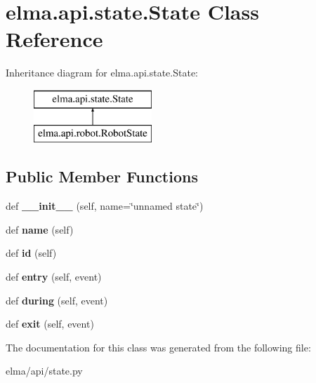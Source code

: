 \hypertarget{classelma_1_1api_1_1state_1_1State}{}\section{elma.\+api.\+state.\+State Class Reference}
\label{classelma_1_1api_1_1state_1_1State}
Inheritance diagram for elma.\+api.\+state.\+State\+:\begin{figure}[H]
\begin{center}
\leavevmode
\includegraphics[height=2.000000cm]{classelma_1_1api_1_1state_1_1State}
\end{center}
\end{figure}
\subsection*{Public Member Functions}
\begin{DoxyCompactItemize}
\item 
\mbox{\label{classelma_1_1api_1_1state_1_1State_a527faccc6a4e00fff27b66ac685a2dbb}} 
def {\bfseries \+\_\+\+\_\+init\+\_\+\+\_\+} (self, name=\char`\"{}unnamed state\char`\"{})
\item 
\mbox{\label{classelma_1_1api_1_1state_1_1State_af557d974acb64b3cd0b6bc687bb1658a}} 
def {\bfseries name} (self)
\item 
\mbox{\label{classelma_1_1api_1_1state_1_1State_aad456a6f35fb49f1e1702eac0954ed2c}} 
def {\bfseries id} (self)
\item 
\mbox{\label{classelma_1_1api_1_1state_1_1State_a9faa0f15ba6f380e9815554cdbfd586d}} 
def {\bfseries entry} (self, event)
\item 
\mbox{\label{classelma_1_1api_1_1state_1_1State_a67235fad4e69aa8c21ec26eae249e01d}} 
def {\bfseries during} (self, event)
\item 
\mbox{\label{classelma_1_1api_1_1state_1_1State_ad57604af6fe62f311bc073cf027ea552}} 
def {\bfseries exit} (self, event)
\end{DoxyCompactItemize}


The documentation for this class was generated from the following file\+:\begin{DoxyCompactItemize}
\item 
elma/api/state.\+py\end{DoxyCompactItemize}
